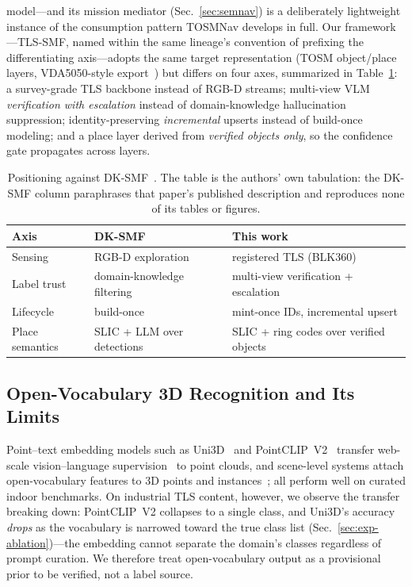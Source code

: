 model---and
its mission mediator (Sec.~\ref{sec:semnav}) is a deliberately lightweight
instance of the consumption pattern TOSMNav develops in full. Our framework---TLS-SMF, named
within the same lineage's convention of prefixing the differentiating
axis---adopts the same target representation (TOSM object/place layers,
VDA5050-style export~\cite{vda5050}) but differs on four axes, summarized in
Table~\ref{tab:dksmf}: a survey-grade
TLS backbone instead of RGB-D streams; multi-view VLM \emph{verification
with escalation} instead of domain-knowledge hallucination suppression;
identity-preserving \emph{incremental} upserts instead of build-once
modeling; and a place layer derived from \emph{verified objects only}, so
the confidence gate propagates across layers.

\begin{table}[t]
\centering
\caption{Positioning against DK-SMF~\cite{joo2025dksmf}. The table is
the authors' own tabulation: the DK-SMF column paraphrases that paper's
published description and reproduces none of its tables or figures.}
\label{tab:dksmf}
\small
\begin{tabular}{@{}lll@{}}
\toprule
Axis & DK-SMF & This work \\
\midrule
Sensing & RGB-D exploration & registered TLS (BLK360) \\
Label trust & domain-knowledge filtering & multi-view verification + escalation \\
Lifecycle & build-once & mint-once IDs, incremental upsert \\
Place semantics & SLIC + LLM over detections & SLIC + ring codes over verified objects \\
\bottomrule
\end{tabular}
\end{table}

\subsection{Open-Vocabulary 3D Recognition and Its Limits}
Point--text embedding models such as Uni3D~\cite{zhou2024uni3d} and
PointCLIP~V2~\cite{zhu2023pointclipv2} transfer web-scale vision--language
supervision~\cite{radford2021clip} to point clouds, and scene-level systems
attach open-vocabulary features to 3D points and
instances~\cite{peng2023openscene,takmaz2023openmask3d}; all perform well
on curated indoor benchmarks.
On industrial TLS content, however, we observe the transfer breaking
down: PointCLIP~V2 collapses to a single class, and Uni3D's accuracy
\emph{drops} as the vocabulary is narrowed toward the true class list
(Sec.~\ref{sec:exp-ablation})---the embedding cannot separate the
domain's classes regardless of prompt curation. We therefore treat
open-vocabulary output as a provisional prior to be verified, not a
label source.


